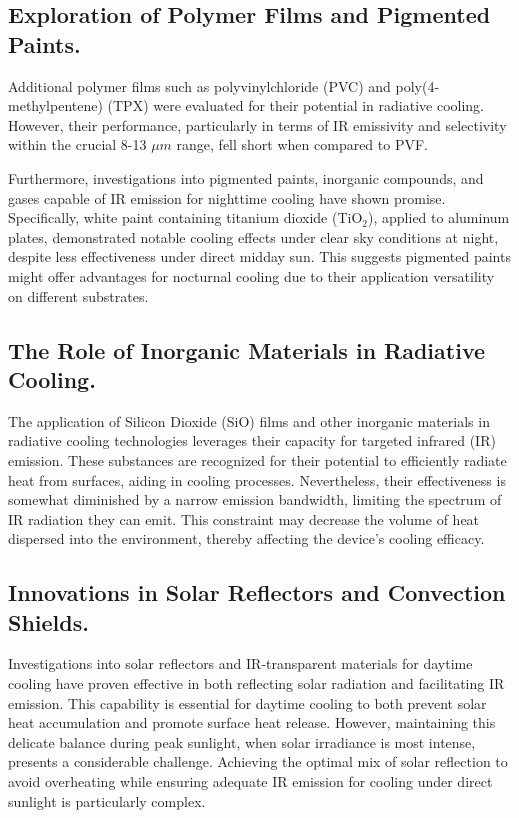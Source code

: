 \subsection{Exploration of Polymer Films and Pigmented Paints.}
Additional polymer films such as polyvinylchloride (PVC) and poly(4-methylpentene) (TPX) were evaluated for their potential in radiative cooling. However, their performance, particularly in terms of IR emissivity and selectivity within the crucial 8-13 $\mu m$ range, fell short when compared to PVF.

Furthermore, investigations into pigmented paints, inorganic compounds, and gases capable of IR emission for nighttime cooling have shown promise. Specifically, white paint containing titanium dioxide (TiO$_2$), applied to aluminum plates, demonstrated notable cooling effects under clear sky conditions at night, despite less effectiveness under direct midday sun. This suggests pigmented paints might offer advantages for nocturnal cooling due to their application versatility on different substrates.

\subsection{The Role of Inorganic Materials in Radiative Cooling.}
The application of Silicon Dioxide (SiO) films and other inorganic materials in radiative cooling technologies leverages their capacity for targeted infrared (IR) emission. These substances are recognized for their potential to efficiently radiate heat from surfaces, aiding in cooling processes. Nevertheless, their effectiveness is somewhat diminished by a narrow emission bandwidth, limiting the spectrum of IR radiation they can emit. This constraint may decrease the volume of heat dispersed into the environment, thereby affecting the device's cooling efficacy.

\subsection{Innovations in Solar Reflectors and Convection Shields.}
Investigations into solar reflectors and IR-transparent materials for daytime cooling have proven effective in both reflecting solar radiation and facilitating IR emission. This capability is essential for daytime cooling to both prevent solar heat accumulation and promote surface heat release. However, maintaining this delicate balance during peak sunlight, when solar irradiance is most intense, presents a considerable challenge. Achieving the optimal mix of solar reflection to avoid overheating while ensuring adequate IR emission for cooling under direct sunlight is particularly complex.

